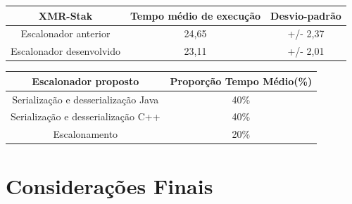\begin{center}
	\begin{tabular}{ |c|c|c| } 
		\hline
		XMR-Stak & Tempo médio de execução & Desvio-padrão \\ 
		\hline
		Escalonador anterior & 24,65 & +/- 2,37 \\ 
		\hline
		Escalonador desenvolvido & 23,11 & +/- 2,01 \\ 
		\hline
	\end{tabular}
\end{center}

\begin{center}
	\begin{tabular}{ |c|c| } 
		\hline
		Escalonador proposto & Proporção Tempo Médio(\%) \\ 
		\hline
		Serialização e desserialização Java & 40\% \\ 
		\hline
		Serialização e desserialização C++ & 40\% \\ 
		\hline
		Escalonamento & 20\% \\ 
		\hline
	\end{tabular}
\end{center}


 

\section{Considerações Finais}



